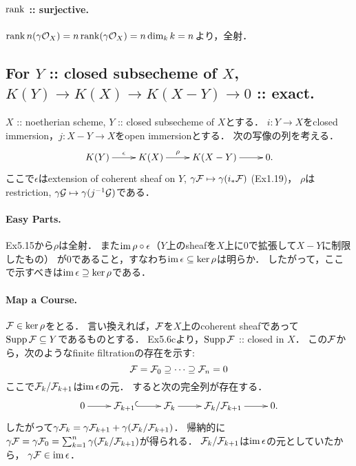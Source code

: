 \documentclass[a4paper]{jsarticle}
\begin{document}
    \paragraph{$\operatorname{rank}$ :: surjective.}
    $\operatorname{rank} n (\gamma \mathcal{O}_X)=n \operatorname{rank} (\gamma \mathcal{O}_X)=n \dim_k k=n$より，全射．

    \subsection{For $Y$ :: closed subsecheme of $X$, $K(Y) \to K(X) \to K(X-Y) \to 0$ :: exact.}
    $X$ :: noetherian scheme, $Y$ :: closed subsecheme of $X$とする．
    $i: Y \to X$をclosed immersion，$j: X-Y \to X$をopen immersionとする．
    次の写像の列を考える．
    \[
        \xymatrix
        {
            K(Y) \ar[r]^-{\epsilon}& K(X) \ar[r]^-{\rho}& K(X-Y) \ar[r]& 0.
       }
    \]
    ここで$\epsilon$はextension of coherent sheaf on $Y$, 
    $\gamma \mathcal{F} \mapsto \gamma (i_* \mathcal{F})$ (Ex1.19)，
    $\rho$はrestriction, $\gamma \mathcal{G} \mapsto \gamma (j^{-1}\mathcal{G})$である．

    \paragraph{Easy Parts.}
    Ex5.15から$\rho$は全射．
    また$\operatorname{im} \rho \circ \epsilon$（$Y$上のsheafを$X$上に$0$で拡張して$X-Y$に制限したもの）
    が$0$であること，すなわち$\operatorname{im} \epsilon \subseteq \ker \rho$は明らか．
    したがって，ここで示すべきは$\operatorname{im} \epsilon \supseteq \ker \rho$である．

    \paragraph{Map a Course.}
    $\mathcal{F} \in \ker \rho$をとる．
    言い換えれば，$\mathcal{F}$を$X$上のcoherent sheafであって
    $\operatorname{Supp} \mathcal{F} \subseteq Y$であるものとする．
    Ex5.6cより，$\operatorname{Supp} \mathcal{F}$ :: closed in $X$．
    この$\mathcal{F}$から，次のようなfinite filtrationの存在を示す:
    \[ \mathcal{F}=\mathcal{F}_0 \supseteq \cdots \supseteq \mathcal{F}_n=0 \]
    ここで$\mathcal{F}_k/\mathcal{F}_{k+1}$は$\operatorname{im} \epsilon$の元．
    すると次の完全列が存在する．
    \[
        \xymatrix
        {
            0 \ar[r]& \shF_{k+1} \ar@{^{(}->}[r]& \shF_k \ar[r]& \shF_{k}/\shF_{k+1} \ar[r]& 0.
        }
    \]
    したがって$\gamma \mathcal{F}_{k}=\gamma \mathcal{F}_{k+1}+\gamma (\mathcal{F}_{k}/\mathcal{F}_{k+1})$．
    帰納的に$\gamma \mathcal{F}=\gamma \mathcal{F}_0=\sum_{k=1}^{n} \gamma (\mathcal{F}_{k}/\mathcal{F}_{k+1})$が得られる．
    $\mathcal{F}_k/\mathcal{F}_{k+1}$は$\operatorname{im} \epsilon$の元としていたから，
    $\gamma \mathcal{F} \in \operatorname{im} \epsilon$．
\end{document}
